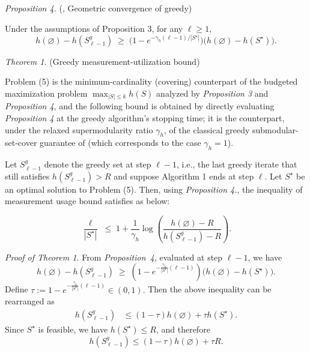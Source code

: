 \documentclass[letterpaper, 10 pt, conference]{ieeeconf}  %
\begin{document}
\noindent \textit{Proposition 4.} (\cite{c22}, Geometric convergence of greedy)

Under the assumptions of Proposition 3, for any \(\ell\ge 1\),
\begin{equation}
h(\varnothing)-h(S^g_{\ell-1})
\;\ge\;
\Big(1-e^{-\gamma_h(\ell-1)/|S^\star|}\Big)\big(h(\varnothing)-h(S^\star)\big).
\end{equation}

\noindent \textit{Theorem 1.} (Greedy measurement-utilization bound)

Problem (5) is the minimum-cardinality (covering) counterpart of the budgeted maximization problem \(\max_{|S|\le k} h(S)\) analyzed by \textit{Proposition 3} and \textit{Proposition 4}, and the following bound is obtained by directly evaluating \textit{Proposition 4} at the greedy algorithm's stopping time; it is the counterpart, under the relaxed supermodularity ratio \(\gamma_h\), of the classical greedy submodular-set-cover guarantee of \cite{c23} (which corresponds to the case \(\gamma_h=1\)).

Let \(S^g_{\ell-1}\) denote the greedy set at step \(\ell-1\), i.e., the last greedy iterate that still satisfies $h(S^g_{\ell-1}) > R$ and suppose Algorithm 1 ends at step \(\ell\). Let \(S^\star\) be an optimal solution to Problem (5). Then, using \textit{Proposition 4.}, the inequality of measurement usage bound satisfies as below:

\begin{equation}
\frac{\ell}{|S^\star|}
\;\le\;
1+\frac{1}{\gamma_h}\log\!\left(
\frac{h(\varnothing)-R}{h(S^g_{\ell-1})-R}
\right).
\end{equation}

\noindent \textit{Proof of Theorem 1.}
From \textit{Proposition~4}, evaluated at step \(\ell-1\), we have
\begin{equation}
h(\varnothing)-h(S^g_{\ell-1})
\;\ge\;
\left(1-e^{-\frac{\gamma_h}{|S^\star|}(\ell-1)}\right)
\bigl(h(\varnothing)-h(S^\star)\bigr).
\end{equation}
Define $\tau
:=
1-e^{-\frac{\gamma_h}{|S^\star|}(\ell-1)} \in (0,1).$
Then the above inequality can be rearranged as
\begin{align}
h(S^g_{\ell-1})
&\le (1-\tau)h(\varnothing)+\tau h(S^\star).
\end{align}
Since \(S^\star\) is feasible, we have \(h(S^\star)\le R\), and therefore
\begin{equation}
h(S^g_{\ell-1})
\le
(1-\tau)h(\varnothing)+\tau R.
\label{eq:greedy_upper_before_stop}
\end{equation}
\end{document}
